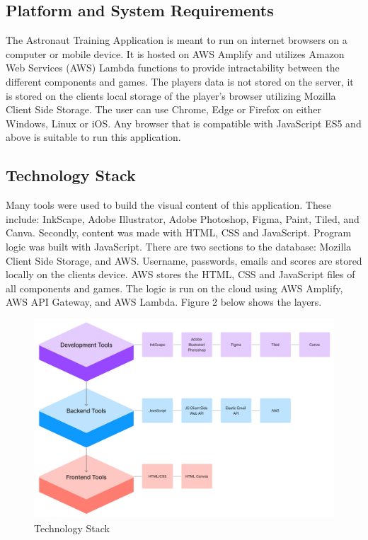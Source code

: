 \documentclass[12pt]{article}
\begin{document}
    \subsection{Platform and System Requirements}

    The Astronaut Training Application is meant to run on internet browsers on a computer or mobile device.  It is hosted on AWS Amplify and utilizes Amazon Web Services (AWS) Lambda functions to provide intractability between the different components and games.  The players data is not stored on the server, it is stored on the clients local storage of the player's browser utilizing Mozilla Client Side Storage.  The user can use Chrome, Edge or Firefox on either Windows, Linux or iOS.  Any browser that is compatible with JavaScript ES5 and above is suitable to run this application.
    
    \subsection{Technology Stack}

    Many tools were used to build the visual content of this application.  These include: InkScape, Adobe Illustrator, Adobe Photoshop, Figma, Paint, Tiled, and Canva. Secondly, content was made with HTML, CSS and JavaScript.  Program logic was built with JavaScript.  There are two sections to the database: Mozilla Client Side Storage, and AWS.  Username, passwords, emails and scores are stored locally on the clients device.  AWS stores the HTML, CSS and JavaScript files of all components and games.  The logic is run on the cloud using AWS Amplify, AWS API Gateway, and AWS Lambda. Figure 2 below shows the layers.

    \begin{figure}[ht]
        \centering
            \includegraphics[height=0.4\textheight]{TechStackD.jpg}
            \caption{Technology Stack}
    \end{figure}
\end{document}
